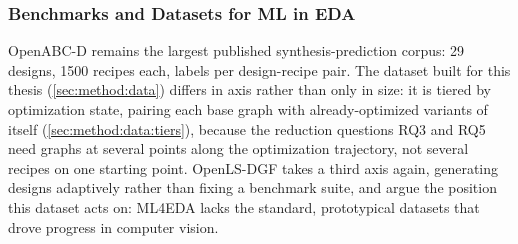 \subsubsection{Benchmarks and Datasets for ML in EDA}
\label{sec:relwork:ml4eda:datasets}
OpenABC-D \citep{chowdhury2021openabc} remains the largest published synthesis-prediction
corpus: 29 designs, 1500 recipes each, labels per design-recipe pair. The dataset built
for this thesis (\ref{sec:method:data}) differs in axis rather than only in size: it is
tiered by optimization state, pairing each base graph with already-optimized variants of
itself (\ref{sec:method:data:tiers}), because the reduction questions RQ3 and RQ5 need
graphs at several points along the optimization trajectory, not several recipes on one
starting point. OpenLS-DGF \citep{ni2025openlsdgf} takes a third axis again, generating
designs adaptively rather than fixing a benchmark suite, and
\citet{chowdhury2023imagenets} argue the position this dataset acts on: ML4EDA lacks the
standard, prototypical datasets that drove progress in computer vision.
